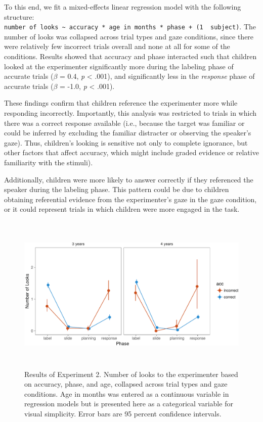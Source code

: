 \documentclass[a4paper,man,apacite,floatsintext]{apa6}
\newenvironment{CodeChunk}{}{}
\begin{document}
To this end, we fit a mixed-effects linear regression model with the
following structure:
\texttt{number\ of\ looks\ \textasciitilde{}\ accuracy\ *\ age\ in\ months\ *\ phase\ +\ (1\ \textbar{}\ subject)}.
The number of looks was collapsed across trial types and gaze
conditions, since there were relatively few incorrect trials overall and
none at all for some of the conditions. Results showed that accuracy and
phase interacted such that children looked at the experimenter
significantly more during the labeling phase of accurate trials
(\(\beta\) = 0.4, \emph{p} \textless{} .001), and significantly less in
the \emph{response} phase of accurate trials (\(\beta\) = -1.0, \emph{p}
\textless{} .001).

These findings confirm that children reference the experimenter more
while responding incorrectly. Importantly, this analysis was restricted
to trials in which there was a correct response available (i.e., because
the target was familiar or could be inferred by excluding the familiar
distracter or observing the speaker's gaze). Thus, children's looking is
sensitive not only to complete ignorance, but other factors that affect
accuracy, which might include graded evidence or relative familiarity
with the stimuli).

Additionally, children were more likely to answer correctly if they
referenced the speaker during the labeling phase. This pattern could be
due to children obtaining referential evidence from the experimenter's
gaze in the gaze condition, or it could represent trials in which
children were more engaged in the task.

\begin{CodeChunk}
\begin{figure}[b]

{\centering \includegraphics[width=6in,height=3in]{figs/acc_results_e2-1} 

}

\caption[Results of Experiment 2]{Results of Experiment 2. Number of looks to the experimenter based on accuracy, phase, and age, collapsed across trial types and gaze conditions. Age in months was entered as a continuous variable in regression models but is presented here as a categorical variable for visual simplicity. Error bars are 95 percent confidence intervals. }\label{fig:acc_results_e2}
\end{figure}
\end{CodeChunk}
\end{document}
